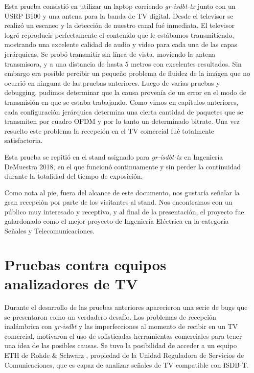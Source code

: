 Esta prueba consistió en utilizar un laptop corriendo \textit{gr-isdbt-tx} junto con un USRP B100 y una antena para la banda de TV digital. Desde el televisor se realizó un escaneo y la detección de nuestro canal fué inmediata. El televisor logró reproducir perfectamente el contenido que le estábamos transmitiendo, mostrando una excelente calidad de audio y video para cada una de las capas jerárquicas. Se probó transmitir sin línea de vista, moviendo la antena transmisora, y a una distancia de hasta 5 metros con excelentes resultados. Sin embargo era posible percibir un pequeño problema de fluidez de la imágen que no ocurrió en ninguna de las pruebas anteriores. Luego de varias pruebas y debugging, pudimos determinar que la causa provenía de un error en el modo de transmisión en que se estaba trabajando. Como vimos en capítulos anteriores, cada configuración jerárquica determina una cierta cantidad de paquetes que se transmiten por cuadro OFDM y por lo tanto un determinado bitrate. Una vez resuelto este problema la recepción en el TV comercial fué totalmente satisfactoria.  

Esta prueba se repitió en el stand asignado para \textit{gr-isdbt-tx} en Ingeniería DeMuestra 2018, en el que funcionó continuamente y sin perder la continuidad durante la totalidad del tiempo de exposición. 

Como nota al pie, fuera del alcance de este documento, nos gustaría señalar la gran recepción por parte de los visitantes al stand. Nos encontramos con un público muy interesado y receptivo, y al final de la presentación, el proyecto fue galardonado como el mejor proyecto de Ingeniería Eléctrica en la categoría Señales y Telecomunicaciones.

\section{Pruebas contra equipos analizadores de TV}

Durante el desarrollo de las pruebas anteriores aparecieron una serie de bugs que se presentaron como un verdadero desafío. Los problemas de recepción inalámbrica con \textit{gr-isdbt} y las imperfecciones al  momento de recibir en un TV comercial, motivaron el uso de sofisticadas herramientas comerciales para tener una idea de las posibles causas. Se tuvo la posibilidad de acceder a un equipo ETH de Rohde \& Schwarz \cite{Rohde}, propiedad de la Unidad Reguladora de Servicios de Comunicaciones, que es capaz de analizar señales de TV compatible con ISDB-T. 

